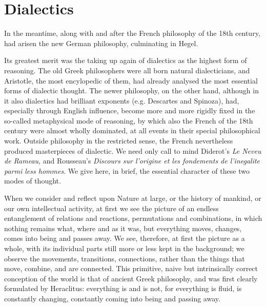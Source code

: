\chapter{Dialectics}

In the meantime, along with and after the French philosophy of the 18th century,
had arisen the new German philosophy, culminating in Hegel.

Its greatest merit was the taking up again of dialectics as the highest form of
reasoning. The old Greek philosophers were all born natural dialecticians, and
Aristotle, the most encylopedic of them, had already analysed the most essential
forms of dialectic thought. The newer philosophy, on the other hand, although in
it also dialectics had brilliant exponents (e.g. Descartes and Spinoza), had,
especially through English influence, become more and more rigidly fixed in the
so-called metaphysical mode of reasoning, by which also the French of the 18th
century were almost wholly dominated, at all events in their special
philosophical work. Outside philosophy in the restricted sense, the French
nevertheless produced masterpieces of dialectic. We need only call to mind
Diderot's \emph{Le Neveu de Rameau}, and Rousseau's \emph{Discours sur l'origine
et les fondements de l'inegalite parmi less hommes}. We give here, in brief, the
essential character of these two modes of thought.

When we consider and reflect upon Nature at large, or the history of mankind, or
our own intellectual activity, at first we see the picture of an endless
entanglement of relations and reactions, permutations and combinations, in which
nothing remains what, where and as it was, but everything moves, changes, comes
into being and passes away. We see, therefore, at first the picture as a whole,
with its individual parts still more or less kept in the background; we observe
the movements, transitions, connections, rather than the things that move,
combine, and are connected. This primitive, naive but intrinsically correct
conception of the world is that of ancient Greek philosophy, and was first
clearly formulated by Heraclitus: everything is and is not, for everything is
fluid, is constantly changing, constantly coming into being and passing
away.

